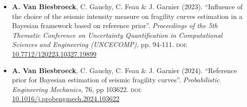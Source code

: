 \begin{itemize}
    \item \textbf{A. Van Biesbroeck}, C. Gauchy, C. Feau \& J. Garnier (2023). ``Influence of the choice of the seismic intensity measure on fragility curves estimation in a Bayesian framework based on reference prior''. \emph{Proceedings of the 5th Thematic Conference on Uncertainty Quantification in Computational Sciences and Engineering (UNCECOMP)}, pp. 94-111. \textsc{doi:} \href{https://dx.doi.org/10.7712/120223.10327.19899}{10.7712/120223.10327.19899}
    \item \textbf{A. Van Biesbroeck}, C. Gauchy, C. Feau \& J. Garnier (2024). ``Reference prior for Bayesian estimation of seismic fragility curves''. \emph{Probabilistic Engineering Mechanics}, 76, pp 103622. \textsc{doi:} \href{https://dx.doi.org/10.1016/j.probengmech.2024.103622}{10.1016/j.probengmech.2024.103622}
\end{itemize}



































